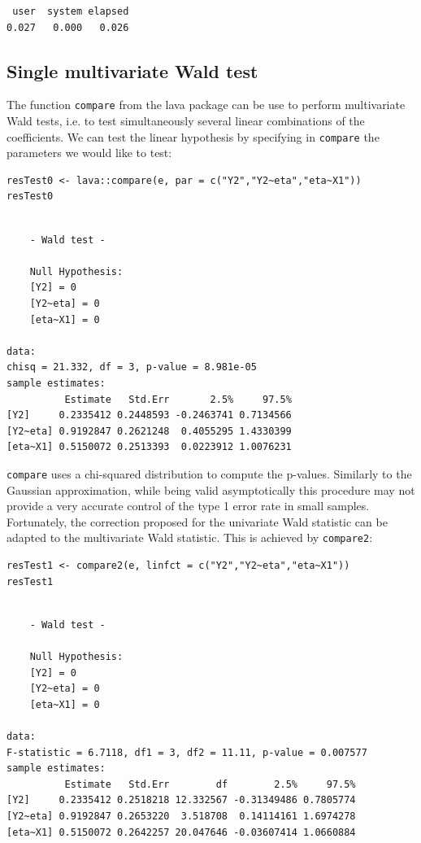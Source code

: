\documentclass[12pt]{article}
\begin{document}
\begin{verbatim}
 user  system elapsed 
0.027   0.000   0.026
\end{verbatim}

\subsection{Single multivariate Wald test}
\label{sec:org6c4b2cc}

The function \texttt{compare} from the lava package can be use to perform
multivariate Wald tests, i.e. to test simultaneously several linear
combinations of the coefficients. We can test the linear hypothesis by
specifying in \texttt{compare} the parameters we would like to test:
\lstset{language=r,label= ,caption= ,captionpos=b,numbers=none}
\begin{lstlisting}
resTest0 <- lava::compare(e, par = c("Y2","Y2~eta","eta~X1"))
resTest0
\end{lstlisting}

\begin{verbatim}

	- Wald test -

	Null Hypothesis:
	[Y2] = 0
	[Y2~eta] = 0
	[eta~X1] = 0

data:  
chisq = 21.332, df = 3, p-value = 8.981e-05
sample estimates:
          Estimate   Std.Err       2.5%     97.5%
[Y2]     0.2335412 0.2448593 -0.2463741 0.7134566
[Y2~eta] 0.9192847 0.2621248  0.4055295 1.4330399
[eta~X1] 0.5150072 0.2513393  0.0223912 1.0076231
\end{verbatim}

\texttt{compare} uses a chi-squared distribution to compute the p-values.
Similarly to the Gaussian approximation, while being valid
asymptotically this procedure may not provide a very accurate control
of the type 1 error rate in small samples. Fortunately, the correction
proposed for the univariate Wald statistic can be adapted to the
multivariate Wald statistic. This is achieved by \texttt{compare2}:
\lstset{language=r,label= ,caption= ,captionpos=b,numbers=none}
\begin{lstlisting}
resTest1 <- compare2(e, linfct = c("Y2","Y2~eta","eta~X1"))
resTest1
\end{lstlisting}

\begin{verbatim}

	- Wald test -

	Null Hypothesis:
	[Y2] = 0
	[Y2~eta] = 0
	[eta~X1] = 0

data:  
F-statistic = 6.7118, df1 = 3, df2 = 11.11, p-value = 0.007577
sample estimates:
          Estimate   Std.Err        df        2.5%     97.5%
[Y2]     0.2335412 0.2518218 12.332567 -0.31349486 0.7805774
[Y2~eta] 0.9192847 0.2653220  3.518708  0.14114161 1.6974278
[eta~X1] 0.5150072 0.2642257 20.047646 -0.03607414 1.0660884
\end{verbatim}
\end{document}

